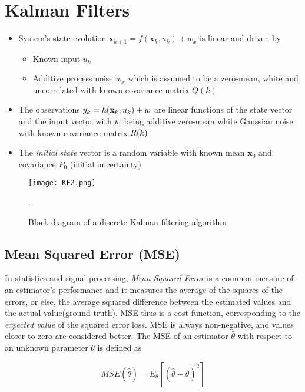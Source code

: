 \section{Kalman Filters}

\begin{itemize}
	\item System's state evolution $\mathbf{x}_{k+1} = f(\mathbf{x}_k,u_k) + w_{\textit{x}}$ is linear and driven by
	\begin{itemize}
		\item Known input $u_k$
		\item Additive process noise $w_{\textit{x}}$ which is assumed to be a zero-mean, white and uncorrelated with known covariance matrix $Q(k)$
	\end{itemize}
	\item The observations $ {{y}}_k = h(\mathbf{x}_k,u_k) + {w} $  are linear functions of the state vector and the input vector with ${w}$ being additive zero-mean white Gaussian noise with known covariance matrix ${R}(k)$
	
	\item The \emph{initial state} vector is a random variable with known mean $\mathbf{x}_0$ and covariance $P_0$ (initial uncertainty)
\end{itemize}


\begin{figure}[H]
	\centering
	\texttt{[image: KF2.png]}
	\caption{Block diagram of a discrete Kalman filtering algorithm}.
	\label{fig:state_vector}
\end{figure}

\subsection{Mean Squared Error (MSE)}
In statistics and signal processing, \emph{Mean Squared Error} is a common measure of an estimator's performance and it measures the average of the squares of the errors, or else, the average squared difference between the estimated values and the actual value(ground truth). MSE thus is a cost function, corresponding to the \emph{expected value} of the squared error loss. MSE is always non-negative, and values closer to zero are considered better. The MSE of an estimator $\hat{\theta}$ with respect to an unknown parameter $\theta$ is defined as 

\[ MSE(\hat{\theta}) = E_{\theta}\left[(\hat{\theta}-\theta)^2\right] \]

